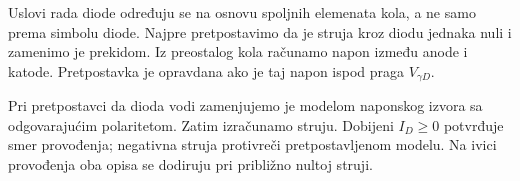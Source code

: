 Uslovi rada diode određuju se na osnovu spoljnih elemenata kola, a ne samo prema simbolu diode. Najpre pretpostavimo da je struja kroz diodu jednaka nuli i zamenimo je prekidom. Iz preostalog kola računamo napon između anode i katode. Pretpostavka je opravdana ako je taj napon ispod praga $V_{\gamma D}$.

Pri pretpostavci da dioda vodi zamenjujemo je modelom naponskog izvora sa odgovarajućim polaritetom. Zatim izračunamo struju. Dobijeni $I_D\geq0$ potvrđuje smer provođenja; negativna struja protivreči pretpostavljenom modelu. Na ivici provođenja oba opisa se dodiruju pri približno nultoj struji.

